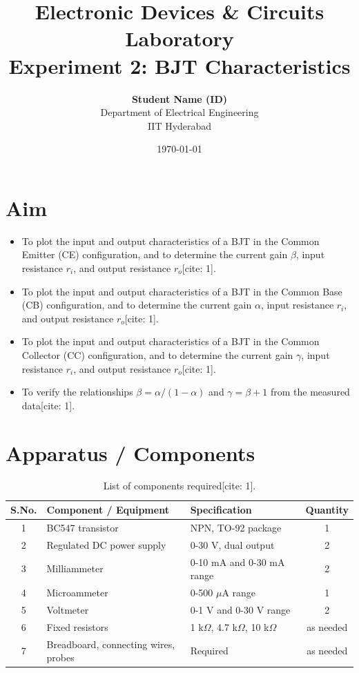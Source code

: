 \documentclass[12pt,a4paper]{article}
\title{\textbf{Electronic Devices \& Circuits Laboratory \\ Experiment 2: BJT Characteristics}}
\author{
    \textbf{Student Name (ID)} \\
    Department of Electrical Engineering \\
    IIT Hyderabad
}
\date{\today}
\begin{document}
\maketitle
\tableofcontents
\newpage

\section{Aim}
\begin{itemize}
    \item To plot the input and output characteristics of a BJT in the Common Emitter (CE) configuration, and to determine the current gain $\beta$, input resistance $r_i$, and output resistance $r_o$[cite: 1].
    \item To plot the input and output characteristics of a BJT in the Common Base (CB) configuration, and to determine the current gain $\alpha$, input resistance $r_i$, and output resistance $r_o$[cite: 1].
    \item To plot the input and output characteristics of a BJT in the Common Collector (CC) configuration, and to determine the current gain $\gamma$, input resistance $r_i$, and output resistance $r_o$[cite: 1].
    \item To verify the relationships $\beta=\alpha/(1-\alpha)$ and $\gamma=\beta+1$ from the measured data[cite: 1].
\end{itemize}

\section{Apparatus / Components}
\begin{table}[H]
    \centering
    \begin{tabular}{|c|l|l|c|}
        \hline
        \textbf{S.No.} & \textbf{Component / Equipment} & \textbf{Specification} & \textbf{Quantity} \\ \hline
        1 & BC547 transistor & NPN, TO-92 package & 1 \\ \hline
        2 & Regulated DC power supply & 0-30 V, dual output & 2 \\ \hline
        3 & Milliammeter & 0-10 mA and 0-30 mA range & 2 \\ \hline
        4 & Microammeter & 0-500 $\mu$A range & 1 \\ \hline
        5 & Voltmeter & 0-1 V and 0-30 V range & 2 \\ \hline
        6 & Fixed resistors & 1 k$\Omega$, 4.7 k$\Omega$, 10 k$\Omega$ & as needed \\ \hline
        7 & Breadboard, connecting wires, probes & Required & as needed \\ \hline
    \end{tabular}
    \caption{List of components required[cite: 1].}
\end{table}
\end{document}
